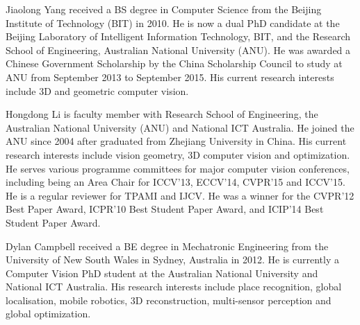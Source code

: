 \documentclass[10pt,journal,cspaper,compsoc]{IEEEtran}
\begin{document}
\ifCLASSOPTIONcaptionsoff
  \newpage
\fi

{


}



\vspace{-20pt}
\begin{IEEEbiography}{Jiaolong Yang}
received a BS degree in Computer Science from the Beijing Institute of Technology (BIT) in 2010. He is now a dual PhD candidate at the Beijing Laboratory of Intelligent Information Technology, BIT, and the Research School of Engineering, Australian National University (ANU). He was awarded a Chinese Government Scholarship by the China Scholarship Council to study at ANU from September 2013 to September 2015. His current research interests include 3D and geometric computer vision.
\vspace{-25pt}
\end{IEEEbiography}
\begin{IEEEbiography}{Hongdong Li}
is faculty member with Research School of Engineering, the Australian National University (ANU) and National ICT Australia.  He joined the ANU since 2004 after graduated from Zhejiang University in China.  His current research interests include vision geometry,  3D computer vision and optimization.  He serves various programme committees for major computer vision conferences, including being an Area Chair for ICCV'13, ECCV'14, CVPR'15 and ICCV'15.  He is a regular reviewer for TPAMI and IJCV. He was a winner for the CVPR'12 Best Paper Award, ICPR'10 Best Student Paper Award, and ICIP'14 Best Student Paper Award.
\vspace{-25pt}
\end{IEEEbiography}
\begin{IEEEbiography}{Dylan Campbell}
received a BE degree in Mechatronic Engineering from the University of New South Wales in Sydney, Australia in 2012. He is currently a Computer Vision PhD student at the Australian National University and National ICT Australia. His research interests include place recognition, global localisation, mobile robotics, 3D reconstruction, multi-sensor perception and global optimization.
\vspace{-25pt}
\end{IEEEbiography}
\end{document}

